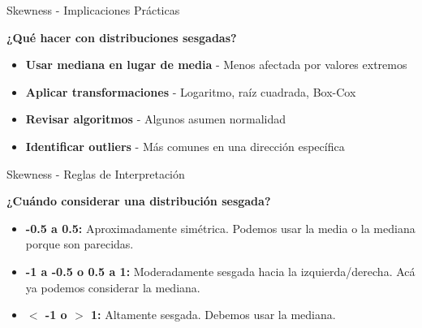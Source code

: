\documentclass{beamer}
\begin{document}
\begin{frame}{Skewness - Implicaciones Prácticas}
    \begin{center}
        \textbf{¿Qué hacer con distribuciones sesgadas?}
    \end{center}
    
    \vspace{0.5cm}
    
    \begin{itemize}
        \item<1->[{\makebox[1em][c]{\textcolor{black}{\faSort}}}] \textbf{Usar mediana en lugar de media} - Menos afectada por valores extremos
        \item<2->[{\makebox[1em][c]{\textcolor{black}{\faCogs}}}] \textbf{Aplicar transformaciones} - Logaritmo, raíz cuadrada, Box-Cox
        \item<3->[{\makebox[1em][c]{\textcolor{black}{\faExclamationTriangle}}}] \textbf{Revisar algoritmos} - Algunos asumen normalidad
        \item<4->[{\makebox[1em][c]{\textcolor{black}{\faSearch}}}] \textbf{Identificar outliers} - Más comunes en una dirección específica
    \end{itemize}
    
\end{frame}

\begin{frame}{Skewness - Reglas de Interpretación}
    \begin{center}
        \textbf{¿Cuándo considerar una distribución sesgada?}
    \end{center}
    
    \vspace{0.5cm}
    
    \begin{itemize}
        \item<1-> \textbf{-0.5 a 0.5:} Aproximadamente simétrica. Podemos usar la media o la mediana porque son parecidas.
        \item<2-> \textbf{-1 a -0.5 o 0.5 a 1:} Moderadamente sesgada hacia la izquierda/derecha. Acá ya podemos considerar la mediana.
        \item<3-> \textbf{$<$ -1 o $>$ 1:} Altamente sesgada. Debemos usar la mediana.
    \end{itemize}
\end{frame}
\end{document}
